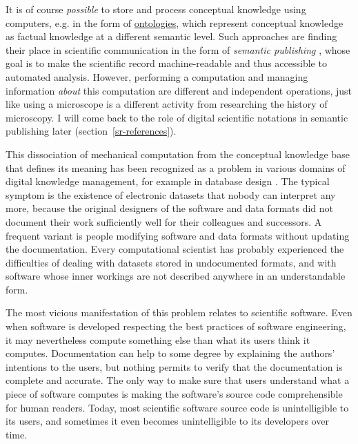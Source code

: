 It is of course \textit{possible} to store and process conceptual knowledge using computers, e.g. in the form of \href{http://en.wikipedia.org/wiki/Ontology_\%28information_science\%29}{ontologies}, which represent conceptual knowledge as factual knowledge at a different semantic level. Such approaches are finding their place in scientific communication in the form of \textit{semantic publishing} \cite{shotton_semantic_2009}, whose goal is to make the scientific record machine-readable and thus accessible to automated analysis. However, performing a computation and managing information \textit{about} this computation are different and independent operations, just like using a microscope is a different activity from researching the history of microscopy. I will come back to the role of digital scientific notations in semantic publishing later (section~\ref{sr-references}).

This dissociation of mechanical computation from the conceptual knowledge base that defines its meaning has been recognized as a problem in various domains of digital knowledge management, for example in database design \cite{borgida_data_2004}. The typical symptom is the existence of electronic datasets that nobody can interpret any more, because the original designers of the software and data formats did not document their work sufficiently well for their colleagues and successors. A frequent variant is people modifying software and data formats without updating the documentation. Every computational scientist has probably experienced the difficulties of dealing with datasets stored in undocumented formats, and with software whose inner workings are not described anywhere in an understandable form.

The most vicious manifestation of this problem relates to scientific software. Even when software is developed respecting the best practices of software engineering, it may nevertheless compute something else than what its users think it computes. Documentation can help to some degree by explaining the authors' intentions to the users, but nothing permits to verify that the documentation is complete and accurate. The only way to make sure that users understand what a piece of software computes is making the software's source code comprehensible for human readers. Today, most scientific software source code is unintelligible to its users, and sometimes it even becomes unintelligible to its developers over time.

